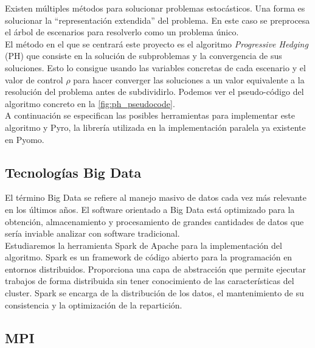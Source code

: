 
Existen múltiples métodos para solucionar problemas estocásticos. Una forma es solucionar la ``representación extendida'' del problema. En este caso se preprocesa el árbol de escenarios para resolverlo como un problema único.\\

El método en el que se centrará este proyecto es el algoritmo \textit{Progressive Hedging} (PH) que consiste en la solución de subproblemas y la convergencia de sus soluciones. Esto lo consigue usando las variables concretas de cada escenario y el valor de control $\rho$ para hacer converger las soluciones a un valor equivalente a la resolución del problema antes de subdividirlo. Podemos ver el pseudo-código del algoritmo concreto en la \autoref{fig:ph_pseudocode}.\\

A continuación se especifican las posibles herramientas para implementar este algoritmo y Pyro, la librería utilizada en la implementación paralela ya existente en Pyomo.

\subsection{Tecnologías Big Data}

El término Big Data se refiere al manejo masivo de datos cada vez más relevante en los últimos años. El software orientado a Big Data está optimizado para la obtención, almacenamiento y procesamiento de grandes cantidades de datos que sería inviable analizar con software tradicional. \\

Estudiaremos la herramienta Spark \cite{spark} de Apache para la implementación del algoritmo. Spark es un framework de código abierto para la programación en entornos distribuidos. Proporciona una capa de abstracción que permite ejecutar trabajos de forma distribuida sin tener conocimiento de las características del cluster. Spark se encarga de la distribución de los datos, el mantenimiento de su consistencia y la optimización de la repartición.\\

\subsection{MPI}

